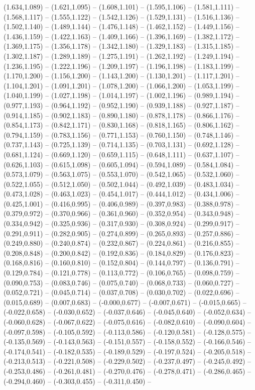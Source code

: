 (1.634,1.089) -- (1.621,1.095) -- (1.608,1.101) -- (1.595,1.106) -- (1.581,1.111) -- (1.568,1.117) -- (1.555,1.122) -- (1.542,1.126) -- (1.529,1.131) -- (1.516,1.136) -- (1.502,1.140) -- (1.489,1.144) -- (1.476,1.148) -- (1.462,1.152) -- (1.449,1.156) -- (1.436,1.159) -- (1.422,1.163) -- (1.409,1.166) -- (1.396,1.169) -- (1.382,1.172) -- (1.369,1.175) -- (1.356,1.178) -- (1.342,1.180) -- (1.329,1.183) -- (1.315,1.185) -- (1.302,1.187) -- (1.289,1.189) -- (1.275,1.191) -- (1.262,1.192) -- (1.249,1.194) -- (1.236,1.195) -- (1.222,1.196) -- (1.209,1.197) -- (1.196,1.198) -- (1.183,1.199) -- (1.170,1.200) -- (1.156,1.200) -- (1.143,1.200) -- (1.130,1.201) -- (1.117,1.201) -- (1.104,1.201) -- (1.091,1.201) -- (1.078,1.200) -- (1.066,1.200) -- (1.053,1.199) -- (1.040,1.199) -- (1.027,1.198) -- (1.014,1.197) -- (1.002,1.196) -- (0.989,1.194) -- (0.977,1.193) -- (0.964,1.192) -- (0.952,1.190) -- (0.939,1.188) -- (0.927,1.187) -- (0.914,1.185) -- (0.902,1.183) -- (0.890,1.180) -- (0.878,1.178) -- (0.866,1.176) -- (0.854,1.173) -- (0.842,1.171) -- (0.830,1.168) -- (0.818,1.165) -- (0.806,1.162) -- (0.794,1.159) -- (0.783,1.156) -- (0.771,1.153) -- (0.760,1.150) -- (0.748,1.146) -- (0.737,1.143) -- (0.725,1.139) -- (0.714,1.135) -- (0.703,1.131) -- (0.692,1.128) -- (0.681,1.124) -- (0.669,1.120) -- (0.659,1.115) -- (0.648,1.111) -- (0.637,1.107) -- (0.626,1.103) -- (0.615,1.098) -- (0.605,1.094) -- (0.594,1.089) -- (0.584,1.084) -- (0.573,1.079) -- (0.563,1.075) -- (0.553,1.070) -- (0.542,1.065) -- (0.532,1.060) -- (0.522,1.055) -- (0.512,1.050) -- (0.502,1.044) -- (0.492,1.039) -- (0.483,1.034) -- (0.473,1.028) -- (0.463,1.023) -- (0.454,1.017) -- (0.444,1.012) -- (0.434,1.006) -- (0.425,1.001) -- (0.416,0.995) -- (0.406,0.989) -- (0.397,0.983) -- (0.388,0.978) -- (0.379,0.972) -- (0.370,0.966) -- (0.361,0.960) -- (0.352,0.954) -- (0.343,0.948) -- (0.334,0.942) -- (0.325,0.936) -- (0.317,0.930) -- (0.308,0.924) -- (0.299,0.917) -- (0.291,0.911) -- (0.282,0.905) -- (0.274,0.899) -- (0.265,0.893) -- (0.257,0.886) -- (0.249,0.880) -- (0.240,0.874) -- (0.232,0.867) -- (0.224,0.861) -- (0.216,0.855) -- (0.208,0.848) -- (0.200,0.842) -- (0.192,0.836) -- (0.184,0.829) -- (0.176,0.823) -- (0.168,0.816) -- (0.160,0.810) -- (0.152,0.804) -- (0.144,0.797) -- (0.136,0.791) -- (0.129,0.784) -- (0.121,0.778) -- (0.113,0.772) -- (0.106,0.765) -- (0.098,0.759) -- (0.090,0.753) -- (0.083,0.746) -- (0.075,0.740) -- (0.068,0.733) -- (0.060,0.727) -- (0.052,0.721) -- (0.045,0.714) -- (0.037,0.708) -- (0.030,0.702) -- (0.022,0.696) -- (0.015,0.689) -- (0.007,0.683) -- (-0.000,0.677) -- (-0.007,0.671) -- (-0.015,0.665) -- (-0.022,0.658) -- (-0.030,0.652) -- (-0.037,0.646) -- (-0.045,0.640) -- (-0.052,0.634) -- (-0.060,0.628) -- (-0.067,0.622) -- (-0.075,0.616) -- (-0.082,0.610) -- (-0.090,0.604) -- (-0.097,0.598) -- (-0.105,0.592) -- (-0.113,0.586) -- (-0.120,0.581) -- (-0.128,0.575) -- (-0.135,0.569) -- (-0.143,0.563) -- (-0.151,0.557) -- (-0.158,0.552) -- (-0.166,0.546) -- (-0.174,0.541) -- (-0.182,0.535) -- (-0.189,0.529) -- (-0.197,0.524) -- (-0.205,0.518) -- (-0.213,0.513) -- (-0.221,0.508) -- (-0.229,0.502) -- (-0.237,0.497) -- (-0.245,0.492) -- (-0.253,0.486) -- (-0.261,0.481) -- (-0.270,0.476) -- (-0.278,0.471) -- (-0.286,0.465) -- (-0.294,0.460) -- (-0.303,0.455) -- (-0.311,0.450) -- 
